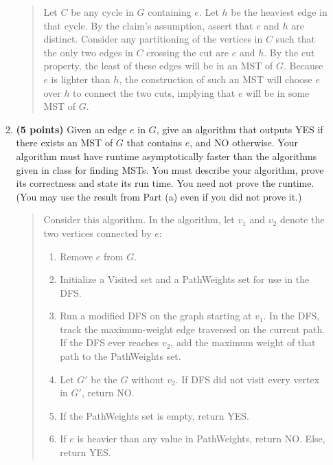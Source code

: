 \documentclass[11pt]{article}
\begin{document}
\begin{enumerate}
\begin{enumerate}
\begin{quote}
      \medskip
      Let $C$ be any cycle in $G$ containing $e$. Let $h$ be the heaviest edge in that cycle. By the claim's assumption, assert that $e$ and $h$ are distinct. Consider any partitioning of the vertices in $C$ such that the only two edges in $C$ crossing the cut are $e$ and $h$. By the cut property, the least of these edges will be in an MST of $G$. Because $e$ is lighter than $h$, the construction of such an MST will choose $e$ over $h$ to connect the two cuts, implying that $e$ will be in some MST of $G$.
    \end{quote}
    \item {\bf (5 points)} Given an edge $e$ in $G$, give an algorithm that outputs YES if there exists an MST of $G$ that contains $e$, and NO otherwise. Your algorithm must have runtime asymptotically faster than the algorithms given in class for finding MSTs. You must describe your algorithm, prove its correctness and state its run time. You need not prove the runtime. (You may use the result from Part (a) even if you did not prove it.)
      \begin{quote}
        \color{purple}
        Consider this algorithm. In the algorithm, let $v_1$ and $v_2$ denote the two vertices connected by $e$:
        \begin{enumerate}
          \item Remove $e$ from $G$. 
          \item Initialize a Visited set and a PathWeights set for use in the DFS.
          \item Run a modified DFS on the graph starting at $v_1$. In the DFS, track the maximum-weight edge traversed on the current path. If the DFS ever reaches $v_2$, add the maximum weight of that path to the PathWeights set. 
          \item Let $G'$ be the $G$ without $v_2$. If DFS did not visit every vertex in $G'$, return NO.
          \item If the PathWeights set is empty, return YES. 
          \item If $e$ is heavier than any value in PathWeights, return NO. Else, return YES.
        \end{enumerate}


\end{quote}
\end{enumerate}
\end{enumerate}
\end{document}
